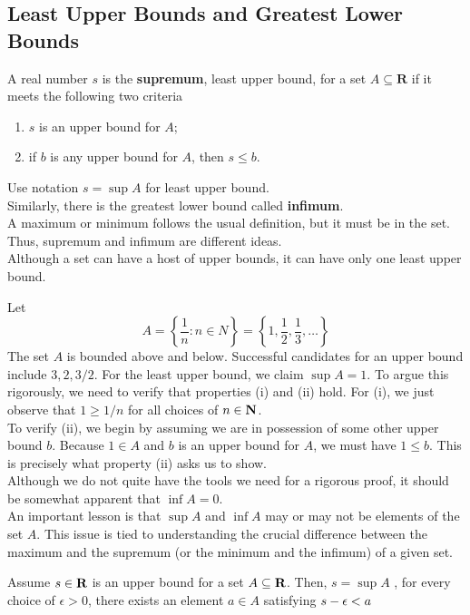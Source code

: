 \subsection{Least Upper Bounds and Greatest Lower Bounds}
A real number $ s $ is the \textbf{supremum}, least upper bound, for a set $ A \subseteq \textbf{R} $ if it meets the following two criteria
\begin{enumerate}
	\item $ s $ is an upper bound for $ A $;
	\item if $ b $ is any upper bound for $ A $, then $ s \leq b $.
\end{enumerate}
Use notation $ s = \sup A $ for least upper bound. \\
Similarly, there is the greatest lower bound called \textbf{infimum}. \\
A maximum or minimum follows the usual definition, but it must be in the set. Thus, supremum and infimum are different ideas. \\
Although a set can have a host of upper bounds, it can have only one least upper bound. \\
\begin{example}
	Let
	\[ A = \left\{ \frac { 1 } { n } : n \in N \right\} = \left\{ 1 , \frac { 1 } { 2 } , \frac { 1 } { 3 } , \ldots \right\} \]
	The set $ A $ is bounded above and below. Successful candidates for an upper bound include $ 3, 2, 3/2 $. For the least upper bound, we claim $ \sup A = 1 $. To argue this rigorously, we need to verify that properties (i) and (ii) hold. For (i), we just observe that $ 1 \geq 1/n $ for all choices of $ n \in \textbf{N} $.\\
	To verify (ii), we begin by assuming we are in possession of some other upper bound $ b $. Because $ 1 \in A $ and $ b $ is an upper bound for $ A $, we must have $ 1 \leq b $. This is precisely what property (ii) asks us to show. \\
	Although we do not quite have the tools we need for a rigorous proof, it should be somewhat apparent that $\inf A = 0 $. \\
	An important lesson is that $ \sup A $ and $ \inf A $ may or may not be elements of the set $ A $. This issue is tied to understanding the	crucial difference between the maximum and the supremum (or the minimum
	and the infimum) of a given set.
\end{example}
\begin{lemma}
	Assume $ s \in \textbf{R} $ is an upper bound for a set $ A \subseteq \textbf{R} $. Then, $ s = \sup A $ \myiff, for every choice of $ \epsilon > 0 $, there exists an element $ a \in A $ satisfying $ s-\epsilon < a $
\end{lemma}
